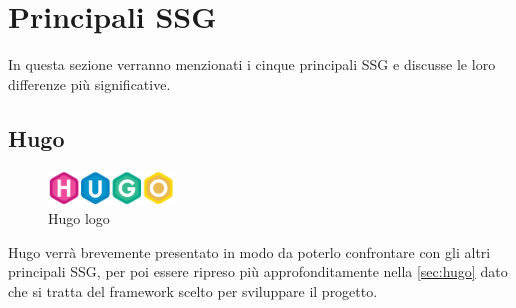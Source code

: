 \documentclass[target=bach,aauheader=]{thud}
\begin{document}
\section{Principali SSG}
In questa sezione verranno menzionati i cinque principali SSG e discusse le loro differenze più significative. 

\subsection{Hugo}\label{subsec:shugo}
\begin{figure}
    \centering
    \includegraphics[width = 0.3\textwidth]{images/Hugo_logo.png}
    \caption{Hugo logo}
\end{figure}

Hugo verrà brevemente presentato in modo da poterlo confrontare con gli altri principali SSG, per poi essere ripreso più approfonditamente nella \cref{sec:hugo} dato che si tratta del framework scelto per sviluppare il progetto.
\end{document}
